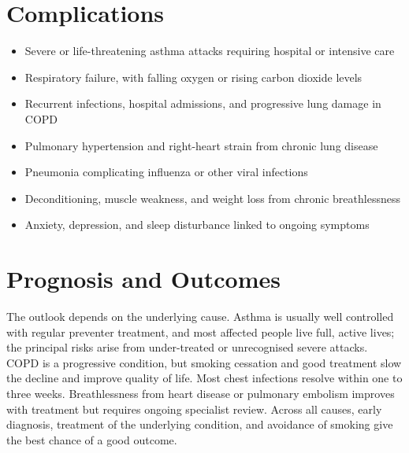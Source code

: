 \section*{Complications}
\begin{itemize}
    \item Severe or life-threatening asthma attacks requiring hospital or intensive care
    \item Respiratory failure, with falling oxygen or rising carbon dioxide levels
    \item Recurrent infections, hospital admissions, and progressive lung damage in COPD
    \item Pulmonary hypertension and right-heart strain from chronic lung disease
    \item Pneumonia complicating influenza or other viral infections
    \item Deconditioning, muscle weakness, and weight loss from chronic breathlessness
    \item Anxiety, depression, and sleep disturbance linked to ongoing symptoms
\end{itemize}

\section*{Prognosis and Outcomes}
The outlook depends on the underlying cause. Asthma is usually well controlled with regular preventer treatment, and most affected people live full, active lives; the principal risks arise from under-treated or unrecognised severe attacks. COPD is a progressive condition, but smoking cessation and good treatment slow the decline and improve quality of life. Most chest infections resolve within one to three weeks. Breathlessness from heart disease or pulmonary embolism improves with treatment but requires ongoing specialist review. Across all causes, early diagnosis, treatment of the underlying condition, and avoidance of smoking give the best chance of a good outcome.

